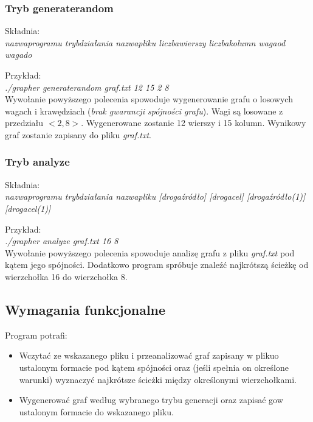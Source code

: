 \documentclass{article}
\begin{document}
\subsubsection{Tryb generate\textunderscore random}
Składnia:\\
\textit{nazwa\textunderscore programu tryb\textunderscore działania nazwa\textunderscore pliku liczba\textunderscore wierszy liczba\textunderscore kolumn waga\textunderscore od waga\textunderscore do}

\medskip

\noindent Przykład:\\
\textit{./grapher generate\textunderscore random graf.txt 12 15 2 8}\\
Wywołanie powyższego polecenia spowoduje wygenerowanie grafu o losowych wagach i krawędziach (\emph{brak gwarancji spójności grafu}). Wagi są losowane z przedziału $<2, 8>$. Wygenerowane zostanie 12 wierszy i 15 kolumn. Wynikowy graf zostanie zapisany do pliku \emph{graf.txt}.

\newpage

\subsubsection{Tryb analyze}
Składnia:\\
\textit{nazwa\textunderscore programu tryb\textunderscore działania nazwa\textunderscore pliku  [droga\textunderscore źródło] [droga\textunderscore cel] [droga\textunderscore źródło(1)] [droga\textunderscore cel(1)]}

\medskip

\noindent Przykład:\\
\textit{./grapher analyze graf.txt 16 8}\\
Wywołanie powyższego polecenia spowoduje analizę grafu z pliku \emph{graf.txt} pod kątem jego spójności. Dodatkowo program spróbuje znaleźć najkrótszą ścieżkę od wierzchołka 16 do wierzchołka 8.

\subsection{Wymagania funkcjonalne}
Program potrafi:
\begin{itemize}
    \item Wczytać ze wskazanego pliku i przeanalizować graf zapisany w pliku\linebreak o ustalonym formacie pod kątem spójności oraz (jeśli spełnia on określone warunki) wyznaczyć najkrótsze ścieżki między określonymi wierzchołkami.
    \item Wygenerować graf według wybranego trybu generacji oraz zapisać go\linebreak w ustalonym formacie do wskazanego pliku.
\end{itemize}
\end{document}
